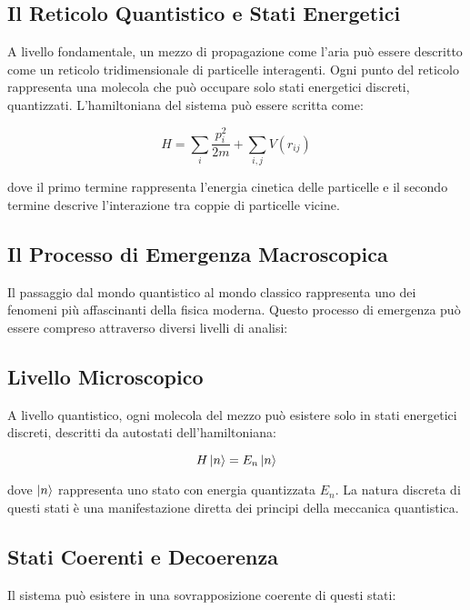\documentclass{gs-adonis}
\begin{document}
\subsection{Il Reticolo Quantistico e Stati
Energetici}\label{il-reticolo-quantistico-e-stati-energetici}

A livello fondamentale, un mezzo di propagazione come l'aria può essere
descritto come un reticolo tridimensionale di particelle interagenti.
Ogni punto del reticolo rappresenta una molecola che può occupare solo
stati energetici discreti, quantizzati. L'hamiltoniana del sistema può
essere scritta come:

\[H = \sum_i \frac{p_i^2}{2m} + \sum_{i,j} V(r_{ij})\]

dove il primo termine rappresenta l'energia cinetica delle particelle e
il secondo termine descrive l'interazione tra coppie di particelle
vicine.

\subsection{Il Processo di Emergenza
Macroscopica}\label{il-processo-di-emergenza-macroscopica}

Il passaggio dal mondo quantistico al mondo classico rappresenta uno dei
fenomeni più affascinanti della fisica moderna. Questo processo di
emergenza può essere compreso attraverso diversi livelli di analisi:

\subsection{Livello Microscopico}\label{livello-microscopico}

A livello quantistico, ogni molecola del mezzo può esistere solo in
stati energetici discreti, descritti da autostati dell'hamiltoniana:

\[H\ket{n} = E_n\ket{n}\]

dove \(\ket{n}\) rappresenta uno stato con energia quantizzata \(E_n\).
La natura discreta di questi stati è una manifestazione diretta dei
principi della meccanica quantistica.

\subsection{Stati Coerenti e
Decoerenza}\label{stati-coerenti-e-decoerenza}

Il sistema può esistere in una sovrapposizione coerente di questi stati:
\end{document}

